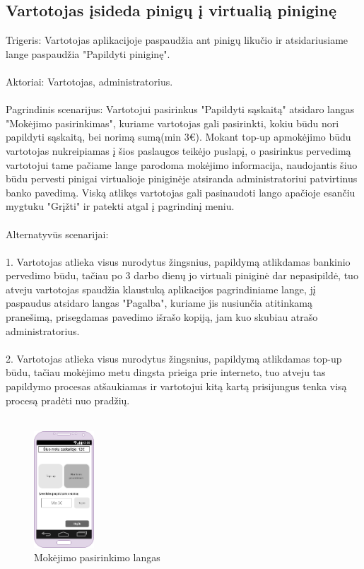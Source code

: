 \documentclass[oneside]{VUMIFPSkursinis}
\begin{document}
\subsection{Vartotojas įsideda pinigų į virtualią piniginę}
Trigeris: Vartotojas aplikacijoje paspaudžia ant pinigų likučio ir atsidariusiame lange paspaudžia "Papildyti piniginę". \\ \\ 
Aktoriai: Vartotojas, administratorius. \\ \\
Pagrindinis scenarijus: Vartotojui pasirinkus "Papildyti sąskaitą" atsidaro langas "Mokėjimo pasirinkimas", kuriame vartotojas gali pasirinkti, kokiu būdu nori papildyti sąskaitą, bei norimą sumą(min 3€). Mokant top-up apmokėjimo būdu vartotojas nukreipiamas į šios paslaugos teikėjo puslapį, o pasirinkus pervedimą vartotojui tame pačiame lange parodoma mokėjimo informacija, naudojantis šiuo būdu pervesti pinigai virtualioje piniginėje atsiranda administratoriui patvirtinus banko pavedimą. Viską atlikęs vartotojas gali pasinaudoti lango apačioje esančiu mygtuku "Grįžti" ir patekti atgal į pagrindinį meniu. \\ \\
Alternatyvūs scenarijai: \\ \\ 
1. Vartotojas atlieka visus nurodytus žingsnius, papildymą atlikdamas bankinio pervedimo būdu, tačiau po 3 darbo dienų jo virtuali piniginė dar nepasipildė, tuo atveju   vartotojas spaudžia klaustuką aplikacijos pagrindiniame lange, jį paspaudus atsidaro langas "Pagalba", kuriame jis nusiunčia atitinkamą pranešimą, prisegdamas pavedimo išrašo kopiją, jam kuo skubiau atrašo administratorius. \\ \\
2. Vartotojas atlieka visus nurodytus žingsnius, papildymą atlikdamas top-up būdu, tačiau mokėjimo metu dingsta prieiga prie interneto, tuo atveju tas papildymo procesas atšaukiamas ir vartotojui kitą kartą prisijungus tenka visą procesą pradėti nuo pradžių. \\ \\
\begin{figure}[h]
    \centering
    \includegraphics[width=0.20\textwidth]{Mokejimo_Pasirinkimas.png}
    \caption{Mokėjimo pasirinkimo langas}
    \label{fig:apmokejimas}
\end{figure}
\end{document}
